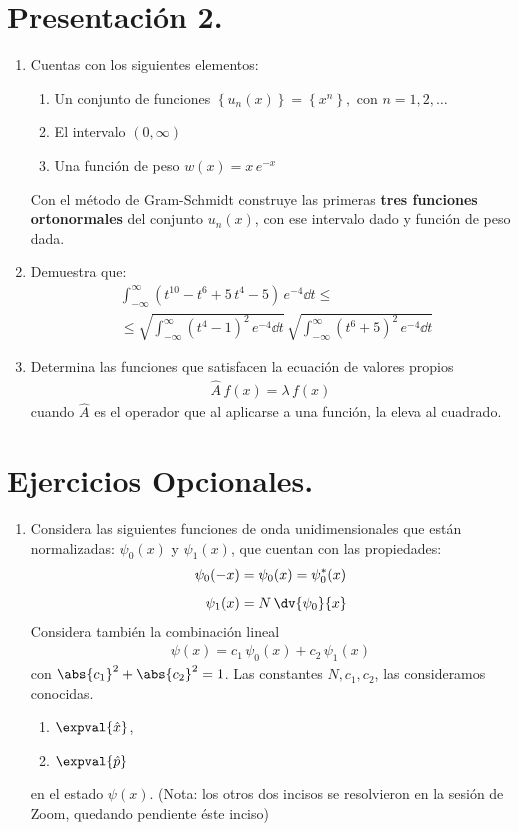 \section{Presentación 2.}
\begin{enumerate}
\item Cuentas con los siguientes elementos:
\begin{enumerate}
\item Un conjunto de funciones $\left\{ u_{n} (x) \right\} = \left\{ x^{n} \right\}, \mbox{ con } n = 1, 2, \ldots$
\item El intervalo $(0, \infty)$
\item Una función de peso $w(x) = x \, e^{-x}$
\end{enumerate}
Con el método de Gram-Schmidt construye las primeras \textbf{tres funciones ortonormales} del conjunto $u_{n}(x)$, con ese intervalo dado y función de peso dada.
\item Demuestra que:
\begin{align*}
&\int_{-\infty}^{\infty} \left( t^{10} - t^{6} + 5 \, t^{4} - 5 \right) \, e^{-4} \dd{t} \leq \\
&\leq \sqrt{\int_{-\infty}^{\infty} \left( t^{4} - 1 \right)^{2} \, e^{-4} \dd{t}} \, \sqrt{\int_{-\infty}^{\infty} \left( t^{6} + 5 \right)^{2} \, e^{-4} \dd{t}}
\end{align*}
\item Determina las funciones que satisfacen la ecuación de valores propios
\begin{align*}
\hat{A} \, f(x) = \lambda \, f(x)
\end{align*}
cuando $\hat{A}$ es el operador que al aplicarse a una función, la eleva al cuadrado.
\end{enumerate}
\section{Ejercicios Opcionales.}
\begin{enumerate}
\item Considera las siguientes funciones de onda unidimensionales que están normalizadas: $\psi_{0}(x)$ y $\psi_{1}(x)$, que cuentan con las propiedades:
\begin{align*}
\psi_{0}(-x) &= \psi_{0}(x) = \psi_{0}^{*} (x) \\[0.5em]
\psi_{1}(x) &= N \, \dv{\psi_{0}}{x}
\end{align*}
Considera también la combinación lineal
\begin{align*}
\psi(x) = c_{1} \, \psi_{0}(x) + c_{2} \, \psi_{1} (x)
\end{align*}
con $\abs{c_{1}}^{2} + \abs{c_{2}}^{2} = 1$. Las constantes $N, c_{1}, c_{2}$, las consideramos conocidas.
\begin{enumerate}
Calcula los valores esperados de:
\item $\expval{\hat{x}}$,
\item $\expval{\hat{p}}$ 
\end{enumerate}
en el estado $\psi(x)$. (Nota: los otros dos incisos se resolvieron en la sesión de Zoom, quedando pendiente éste inciso)
\end{enumerate}
